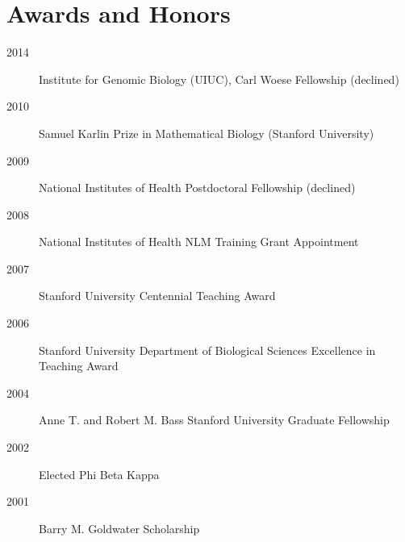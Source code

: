 \documentclass[11pt]{article}
\begin{document}
  \section{Awards and Honors}

  \begin{description}
  \item[2014] Institute for Genomic Biology (UIUC), Carl Woese Fellowship (declined)
  \item[2010] Samuel Karlin Prize in Mathematical Biology (Stanford University) 
  \item[2009] National Institutes of Health Postdoctoral Fellowship (declined)
  \item[2008] National Institutes of Health NLM Training Grant Appointment
  \item[2007] Stanford University Centennial Teaching Award
  \item[2006] Stanford University Department of Biological Sciences Excellence in Teaching Award
  \item[2004] Anne T. and Robert M. Bass Stanford University Graduate Fellowship
  \item[2002] Elected Phi Beta Kappa
  \item[2001] Barry M. Goldwater Scholarship
  \end{description}
\end{document}
